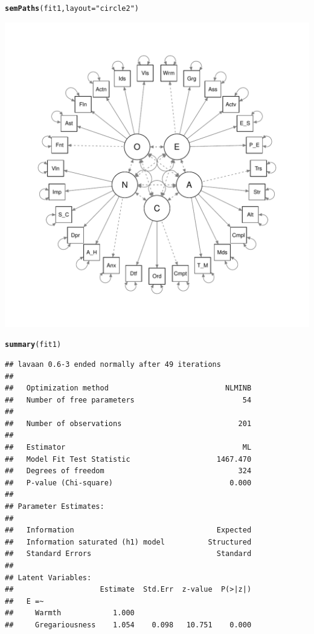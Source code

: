 \documentclass{article}\usepackage[]{graphicx}\usepackage[]{color}
\makeatletter
\def\maxwidth{ %
  \ifdim\Gin@nat@width>\linewidth
    \linewidth
  \else
    \Gin@nat@width
  \fi
}
\newcommand{\hlstr}[1]{\textcolor[rgb]{0.192,0.494,0.8}{#1}}%
\newcommand{\hlstd}[1]{\textcolor[rgb]{0.345,0.345,0.345}{#1}}%
\newcommand{\hlkwc}[1]{\textcolor[rgb]{0.333,0.667,0.333}{#1}}%
\newcommand{\hlkwd}[1]{\textcolor[rgb]{0.737,0.353,0.396}{\textbf{#1}}}%
\newenvironment{kframe}{%
 \def\at@end@of@kframe{}%
 \ifinner\ifhmode%
  \def\at@end@of@kframe{\end{minipage}}%
  \begin{minipage}{\columnwidth}%
 \fi\fi%
 \def\FrameCommand##1{\hskip\@totalleftmargin \hskip-\fboxsep
 \colorbox{shadecolor}{##1}\hskip-\fboxsep
     \hskip-\linewidth \hskip-\@totalleftmargin \hskip\columnwidth}%
 \MakeFramed {\advance\hsize-\width
   \@totalleftmargin\z@ \linewidth\hsize
   \@setminipage}}%
 {\par\unskip\endMakeFramed%
 \at@end@of@kframe}
\newenvironment{knitrout}{}{} %
\makeatother
\begin{document}
\begin{knitrout}
\begin{kframe}
\begin{alltt}
\hlkwd{semPaths}\hlstd{(fit1,} \hlkwc{layout} \hlstd{=} \hlstr{"circle2"}\hlstd{)}
\end{alltt}
\end{kframe}
\includegraphics[width=\maxwidth]{figure/unnamed-chunk-5-1} 
\begin{kframe}\begin{alltt}
\hlkwd{summary}\hlstd{(fit1)}
\end{alltt}
\begin{verbatim}
## lavaan 0.6-3 ended normally after 49 iterations
## 
##   Optimization method                           NLMINB
##   Number of free parameters                         54
## 
##   Number of observations                           201
## 
##   Estimator                                         ML
##   Model Fit Test Statistic                    1467.470
##   Degrees of freedom                               324
##   P-value (Chi-square)                           0.000
## 
## Parameter Estimates:
## 
##   Information                                 Expected
##   Information saturated (h1) model          Structured
##   Standard Errors                             Standard
## 
## Latent Variables:
##                    Estimate  Std.Err  z-value  P(>|z|)
##   E =~                                                
##     Warmth            1.000                           
##     Gregariousness    1.054    0.098   10.751    0.000

\end{verbatim}
\end{kframe}
\end{knitrout}
\end{document}
